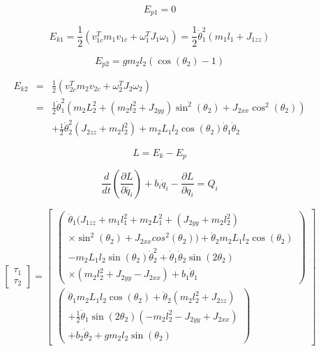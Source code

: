 \begin{equation}
 E_{p1} = 0
\end{equation}

\begin{equation}
E_{k1}=\frac{1}{2}(v^T_{1c}m_1v_{1c}+\omega^T_1J_1\omega_1)=\frac{1}{2}\dot{\theta}^2_1(m_1l_1+J_{1zz})
\end{equation}

\begin{equation}
E_{p2}=gm_2l_2(\cos(\theta_2)-1)
\end{equation}

\begin{eqnarray}
E_{k2}&=&\frac{1}{2}(v^T_{2c}m_2v_{2c}+\omega^T_2J_2\omega_2)\nonumber \\
&=&\frac{1}{2}\dot{\theta}^2_1(m_2L^2_2+(m_2l^2_2+J_{2yy})\sin^2(\theta_2)+J_{2xx}\cos^2(\theta_2))\nonumber \\
&&+\frac{1}{2}\dot{\theta}^2_2(J_{2zz}+m_2l^2_2)+m_2L_1l_2\cos(\theta_2)\dot{\theta}_1\dot{\theta}_2
\end{eqnarray}

\begin{equation}
L=E_k-E_p
\end{equation}

\begin{equation}
\frac{d}{dt}(\frac{\partial L}{\partial\dot{q_i}})+b_i\dot{q}_i-\frac{\partial L}{\partial q_i}=Q_i
\end{equation}

\begin{equation}
\begin{bmatrix}
\tau_1 \\
\tau_2
\end{bmatrix}
=
\begin{bmatrix}
\begin{pmatrix}
\ddot{\theta}_1(J_{1zz}+m_1l^2_1+m_2L^2_1+(J_{2yy}+m_2l^2_2) 						\\
\times \sin^2(\theta_2)+J_{2xx}cos^2(\theta_2))+\ddot{\theta}_2m_2L_1l_2\cos(\theta_2)			\\
-m_2L_1l_2\sin(\theta_2)\dot{\theta}^2_2+\dot{\theta}_1\dot{\theta}_2\sin(2\theta_2)	\\
\times(m_2l^2_2+J_{2yy}-J_{2xx})+b_1\dot{\theta}_1
\end{pmatrix}
\\
\begin{pmatrix}
\ddot{\theta}_1m_2L_1l_2\cos(\theta_2)+\ddot{\theta}_2(m_2l^2_2+J_{2zz})	\\
+\frac{1}{2}\dot{\theta}_1\sin(2\theta_2)(-m_2l^2_2-J_{2yy}+J_{2xx})						\\
+b_2\dot{\theta}_2+gm_2l_2\sin(\theta_2)
\end{pmatrix}
\end{bmatrix}
\end{equation}

